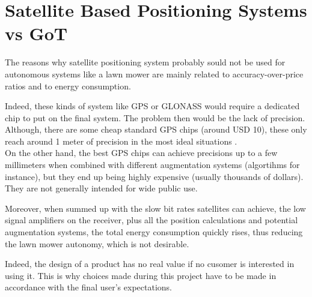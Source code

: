 \section{Satellite Based Positioning Systems vs GoT}
The reasons why satellite positioning system probably sould not be used for autonomous systems like a lawn mower are mainly related to accuracy-over-price ratios and to energy consumption.

Indeed, these kinds of system like GPS or GLONASS would require a dedicated chip to put on the final system. The problem then would be the lack of precision. Although, there are some cheap standard GPS chips (around USD 10), these only reach around 1 meter of precision in the most ideal situations \cite{GPSUSWebsiteAccuracy,Miller}. \\
On the other hand, the best GPS chips can achieve precisions up to a few millimeters \cite{GPSUSWebsiteAccuracy} when combined with different augmentation systems (algortihms for instance), but they end up being highly expensive (usually thousands of dollars). They are not generally intended for wide public use.

Moreover, when summed up with the slow bit rates satellites can achieve, the low signal amplifiers on the receiver, plus all the position calculations and potential augmentation systems, the total energy consumption quickly rises, thus reducing the lawn mower autonomy, which is not desirable.

Indeed, the design of a product has no real value if no cusomer is interested in using it. This is why choices made during this project have to be made in accordance with the final user's expectations.